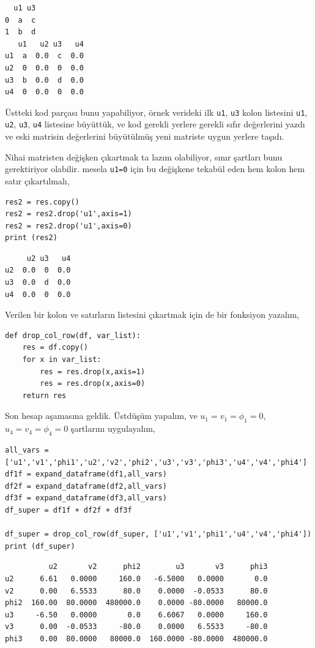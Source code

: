 \documentclass[12pt,fleqn]{article}\usepackage{../../common}
\begin{document}
\begin{verbatim}
  u1 u3
0  a  c
1  b  d
   u1   u2 u3   u4
u1  a  0.0  c  0.0
u2  0  0.0  0  0.0
u3  b  0.0  d  0.0
u4  0  0.0  0  0.0
\end{verbatim}

Üstteki kod parçası bunu yapabiliyor, örnek verideki ilk \verb!u1!, \verb!u3!
kolon listesini \verb!u1!, \verb!u2!, \verb!u3!, \verb!u4! listesine büyüttük,
ve kod gerekli yerlere gerekli sıfır değerlerini yazdı ve eski matrisin
değerlerini büyütülmüş yeni matriste uygun yerlere taşıdı.

Nihai matristen değişken çıkartmak ta lazım olabiliyor, sınır şartları bunu
gerektiriyor olabilir. mesela \verb!u1=0! için bu değişkene tekabül eden hem
kolon hem satır çıkartılmalı,

\begin{verbatim}
res2 = res.copy()
res2 = res2.drop('u1',axis=1)
res2 = res2.drop('u1',axis=0)
print (res2)
\end{verbatim}

\begin{verbatim}
     u2 u3   u4
u2  0.0  0  0.0
u3  0.0  d  0.0
u4  0.0  0  0.0
\end{verbatim}

Verilen bir kolon ve satırların listesini çıkartmak için de bir fonksiyon yazalım,

\begin{verbatim}
def drop_col_row(df, var_list):
    res = df.copy()
    for x in var_list:
        res = res.drop(x,axis=1)
        res = res.drop(x,axis=0)
    return res
\end{verbatim}

Son hesap aşamasına geldik. Üstdüşüm yapalım, ve $u_1 = v_1 = \phi_1 = 0$,
$u_4 = v_4 = \phi_4 = 0$ şartlarını uygulayalım,

\begin{verbatim}
all_vars = ['u1','v1','phi1','u2','v2','phi2','u3','v3','phi3','u4','v4','phi4']
df1f = expand_dataframe(df1,all_vars)
df2f = expand_dataframe(df2,all_vars)
df3f = expand_dataframe(df3,all_vars)
df_super = df1f + df2f + df3f

df_super = drop_col_row(df_super, ['u1','v1','phi1','u4','v4','phi4'])
print (df_super)
\end{verbatim}

\begin{verbatim}
          u2       v2      phi2        u3       v3      phi3
u2      6.61   0.0000     160.0   -6.5000   0.0000       0.0
v2      0.00   6.5533      80.0    0.0000  -0.0533      80.0
phi2  160.00  80.0000  480000.0    0.0000 -80.0000   80000.0
u3     -6.50   0.0000       0.0    6.6067   0.0000     160.0
v3      0.00  -0.0533     -80.0    0.0000   6.5533     -80.0
phi3    0.00  80.0000   80000.0  160.0000 -80.0000  480000.0
\end{verbatim}
\end{document}
